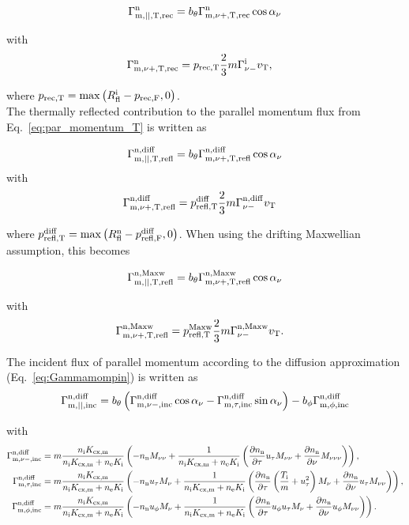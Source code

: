 \begin{equation}
    \Gamma^{\mathrm{n}}_{\mathrm{m,||,T,rec}} = \pit \fmozrect \cosa
\end{equation}


with
\begin{align}
    \fmozrect & = \pti \frac{2}{3} m \fdni \vT,
\end{align}

where $\pti = \max \left( \Rifl - \pfi, 0 \right)$. \\

The thermally reflected contribution to the parallel momentum flux from Eq.~\eqref{eq:par_momentum_T} is written as

\begin{equation}
    \Gamma^{\mathrm{n,diff}}_{\mathrm{m,||,T,refl}} = \pit \fmozrefldt \cosa
\end{equation}
with
\begin{align}
    \fmozrefldt & = \ptnd \frac{2}{3} m \fnnid \vT
\end{align}

where $\ptnd = \max \left( \Rnxfl - \pfnd , 0 \right)$. When using the drifting Maxwellian assumption, this becomes

\begin{equation}
    \Gamma^{\mathrm{n,Maxw}}_{\mathrm{m,||,T,refl}} = \pit \fmozreflmt \cosa
\end{equation}

with
\begin{align}
    \fmozreflmt & = \ptnm \frac{2}{3} m \fnnim \vT.
\end{align}

The incident flux of parallel momentum according to the diffusion approximation (Eq.~\eqref{eq:Gammamompin}) is written as
\begin{equation}
    \Gamma^{\mathrm{n,diff}}_{\mathrm{m,||,inc}} = \pit \left( \fmozincd \cosa - \fmoyincd \sina \right) - \pitt \fmoxincd
\end{equation}

with
\begin{align}
    \fmozincd & = m \frac{\vcx}{\vtot} \left( - \nn \itwol + \frac{1}{\vtot} \left( \dnndy \uy \itwol + \dnndz \ithreel \right) \right), \\
    \fmoyincd & = m \frac{\vcx}{\vtot} \left( - \nn \uy \ionel + \frac{1}{\vtot} \left( \dnndy \left( \frac{\Ti}{m} + \uy^2 \right) \ionel + \dnndz \uy \itwol \right) \right),\\
    \fmoxincd & = m \frac{\vcx}{\vtot} \left( - \nn \ux \ionel + \frac{1}{\vtot} \left( \dnndy \ux \uy \ionel + \dnndz \ux \itwol \right) \right).
\end{align}

